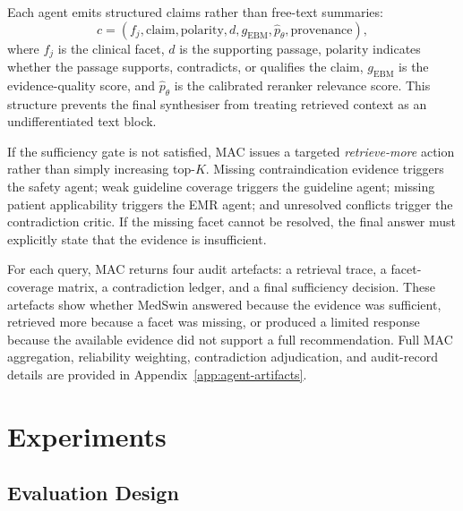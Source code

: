 \documentclass[conference]{IEEEtran}
\begin{document}
Each agent emits structured claims rather than free-text summaries:
\[
c =
(f_j,\mathrm{claim},\mathrm{polarity},d,g_{\mathrm{EBM}},
\widehat{p}_{\theta},\mathrm{provenance}),
\]
where $f_j$ is the clinical facet, $d$ is the supporting passage, $\mathrm{polarity}$ indicates whether the passage supports, contradicts, or qualifies the claim, $g_{\mathrm{EBM}}$ is the evidence-quality score, and $\widehat{p}_{\theta}$ is the calibrated reranker relevance score. This structure prevents the final synthesiser from treating retrieved context as an undifferentiated text block.

If the sufficiency gate is not satisfied, MAC issues a targeted \textit{retrieve-more} action rather than simply increasing top-$K$. Missing contraindication evidence triggers the safety agent; weak guideline coverage triggers the guideline agent; missing patient applicability triggers the EMR agent; and unresolved conflicts trigger the contradiction critic. If the missing facet cannot be resolved, the final answer must explicitly state that the evidence is insufficient.

For each query, MAC returns four audit artefacts: a retrieval trace, a facet-coverage matrix, a contradiction ledger, and a final sufficiency decision. These artefacts show whether MedSwin answered because the evidence was sufficient, retrieved more because a facet was missing, or produced a limited response because the available evidence did not support a full recommendation. Full MAC aggregation, reliability weighting, contradiction adjudication, and audit-record details are provided in Appendix~\ref{app:agent-artifacts}.


\section{Experiments}
\label{sec:eval_medquad}

\subsection{Evaluation Design}
\end{document}
